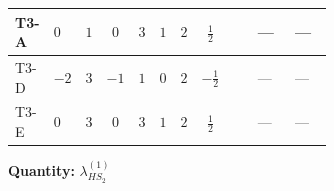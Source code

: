 \documentclass[8pt]{article}
\begin{document}
\begin{landscape}
\begin{longtable}{@{}llcccccc >{\raggedright\arraybackslash}p{0.21\linewidth} >{\raggedright\arraybackslash}p{0.21\linewidth} >{\raggedright\arraybackslash}p{0.21\linewidth}@{}}
\midrule
T3-A & $0$ & $1$ & $0$ & $3$ & $1$ & $2$ & $\frac{1}{2}$ & \scriptsize\adjustbox{max width=\linewidth}{$\begin{gathered} -2 \operatorname{Tr}\!\left({y_2}\,\left({y_2}\right)^{\dagger}\,{Y_e}\,\left({Y_e}\right)^{\dagger}\right)\end{gathered}$} & --- & --- \\
\midrule
T3-D & $-2$ & $3$ & $-1$ & $1$ & $0$ & $2$ & $-\frac{1}{2}$ & \scriptsize\adjustbox{max width=\linewidth}{$\begin{gathered} -4 \operatorname{Tr}\!\left({y_2}\,\left({y_2}\right)^{\dagger}\,{Y_e}\,\left({Y_e}\right)^{\dagger}\right)\end{gathered}$} & --- & --- \\
\midrule
T3-E & $0$ & $3$ & $0$ & $3$ & $1$ & $2$ & $\frac{1}{2}$ & \scriptsize\adjustbox{max width=\linewidth}{$\begin{gathered} -2 \operatorname{Tr}\!\left({y_2}\,\left({y_2}\right)^{\dagger}\,{Y_e}\,\left({Y_e}\right)^{\dagger}\right)\end{gathered}$} & --- & --- \\
\midrule
\bottomrule
\end{longtable}
\clearpage
\noindent\textbf{Quantity: }$\lambda_{HS_2}^{(1)}$\par\smallskip

\end{landscape}
\end{document}
